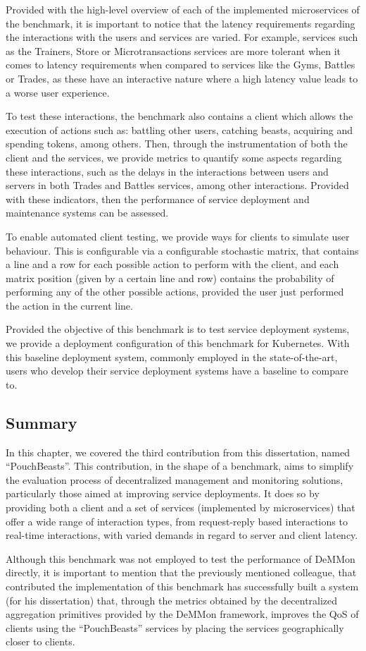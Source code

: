 Provided with the high-level overview of each of the implemented microservices of the benchmark, it is important to notice that the latency requirements regarding the interactions with the users and services are varied. For example, services such as the Trainers, Store or Microtransactions services are more tolerant when it comes to latency requirements when compared to services like the Gyms, Battles or Trades, as these have an interactive nature where a high latency value leads to a worse user experience.

To test these interactions, the benchmark also contains a client which allows the execution of actions such as: battling other users, catching beasts, acquiring and spending tokens, among others. Then, through the instrumentation of both the client and the services, we provide metrics to quantify some aspects regarding these interactions, such as the delays in the interactions between users and servers in both Trades and Battles services, among other interactions. Provided with these indicators, then the performance of service deployment and maintenance systems can be assessed.

To enable automated client testing, we provide ways for clients to simulate user behaviour. This is configurable via a configurable stochastic matrix, that contains a line and a row for each possible action to perform with the client, and each matrix position (given by a certain line and row) contains the probability of performing any of the other possible actions, provided the user just performed the action in the current line. 

Provided the objective of this benchmark is to test service deployment systems, we provide a deployment configuration of this benchmark for Kubernetes. With this baseline deployment system, commonly employed in the state-of-the-art, users who develop their service deployment systems have a baseline to compare to.

\subsection{Summary}

In this chapter, we covered the third contribution from this dissertation, named ``PouchBeasts''. This contribution, in the shape of a benchmark, aims to simplify the evaluation process of decentralized management and monitoring solutions, particularly those aimed at improving service deployments. It does so by providing both a client and a set of services (implemented by microservices) that offer a wide range of interaction types, from request-reply based interactions to real-time interactions, with varied demands in regard to server and client latency.

Although this benchmark was not employed to test the performance of DeMMon directly, it is important to mention that the previously mentioned colleague, that contributed the implementation of this benchmark has successfully built a system (for his dissertation) that, through the metrics obtained by the decentralized aggregation primitives provided by the DeMMon framework, improves the QoS of clients using the ``PouchBeasts'' services by placing the services geographically closer to clients.